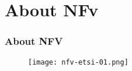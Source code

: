 \section{About NFv}

\begin{frame}[allowframebreaks]
\frametitle{About NFV}

\begin{center}
  \begin{figure}
    \texttt{[image: nfv-etsi-01.png]}
  \end{figure}
\end{center}

\end{frame}
